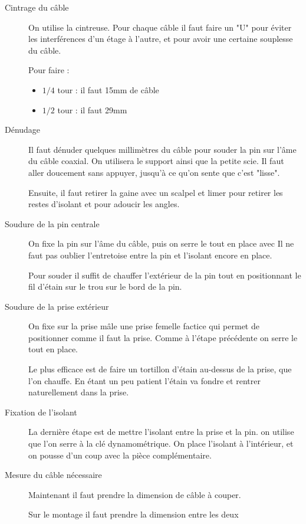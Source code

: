\documentclass[a4paper,11pt]{article}
\begin{document}
\begin{description}
    \item[Cintrage du câble] On utilise la cintreuse. Pour chaque câble il faut faire un "U" pour éviter les interférences d'un étage à l'autre, et pour avoir une certaine souplesse du câble.
    
    Pour faire : 
    \begin{itemize}
        \item $1/4$ tour : il faut 15mm de câble
        \item $1/2$ tour : il faut 29mm
    \end{itemize}
     \item[Dénudage] Il faut dénuder quelques millimètres du câble pour souder la pin sur l'âme du câble coaxial.
     On utilisera le support %
     ainsi que la petite scie. Il faut aller doucement sans appuyer, jusqu'à ce qu'on sente que c'est "lisse".
     
     Ensuite, il faut retirer la gaine avec un scalpel et limer pour retirer les restes d'isolant et pour adoucir les angles.
     \item[Soudure de la pin centrale] On fixe la pin sur l'âme du câble, puis on serre le tout en place avec %
     Il ne faut pas oublier l'entretoise  %
     entre la pin et l'isolant encore en place.
     
     Pour souder il suffit de chauffer l'extérieur de la pin tout en positionnant le fil d'étain sur le trou sur le bord de la pin.
     \item[Soudure de la prise extérieur] On fixe sur la prise mâle une prise femelle factice qui permet de positionner comme il faut la prise. Comme à l'étape précédente on serre le tout en place.
     
     Le plus efficace est de faire un tortillon d'étain au-dessus de la prise, que l'on chauffe. En étant un peu patient l'étain va fondre et rentrer naturellement dans la prise.
     \item[Fixation de l'isolant] La dernière étape est de mettre l'isolant entre la prise et la pin. on utilise %
     que l'on serre à la clé dynamométrique. On place l'isolant à l'intérieur, et on pousse d'un coup avec la pièce complémentaire.
     
     \item[Mesure du câble nécessaire] Maintenant il faut prendre la dimension de câble à couper.
     
     Sur le montage il faut prendre la dimension entre les deux 
     
\end{description}
\end{document}

